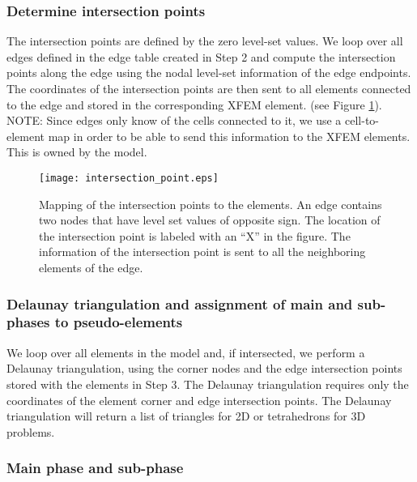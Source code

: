 
\subsubsection{Determine intersection points}

The intersection points are defined by the zero level-set values. We loop over all edges defined in the edge table created in Step 2 and compute the intersection points along the edge using the nodal level-set information of the edge endpoints.  The coordinates of the intersection points are then sent to all elements connected to the edge and stored in the corresponding XFEM element. (see Figure \ref{fig:intersection_point}). NOTE: Since edges only know of the cells connected to it, we use a cell-to-element map in order to be able to send this information to the XFEM elements. This is owned by the model.

\begin{figure}[htbp]
	\centering
	\texttt{[image: intersection\_point.eps]}
	\caption[Intersection point computation]{Mapping of the intersection points to the elements. An edge contains two nodes that have level set values of opposite sign. The location of the intersection point is labeled with an ``X'' in the figure. The information of the intersection point is sent to all the neighboring elements of the edge.}
	\label{fig:intersection_point}
\end{figure}


\subsubsection{Delaunay triangulation and assignment of main and sub-phases to pseudo-elements}

We loop over all elements in the model and, if intersected, we perform a Delaunay triangulation, using the corner nodes and the edge intersection points stored with the elements in Step 3. The Delaunay triangulation requires only the coordinates of the element corner and edge intersection points. The Delaunay triangulation will return a list of triangles for 2D or tetrahedrons for 3D problems. 


\subsubsection{Main phase and sub-phase}
\label{sec:main-phase-sub-phase}

